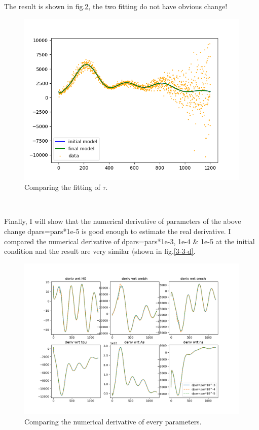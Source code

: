 \documentclass[showpacs, oneside, onecolumn, prl, amsmath, amssymb, nofootinbib, superscriptaddress, notitlepage]{revtex4-1}
\newcommand\bfig{\begin{figure}}
\newcommand\efig{\end{figure}}
\begin{document}
The result is shown in fig.\ref{3-3-2}, the two fitting do not have obvious change!
\bfig
	\centering
	\includegraphics[scale=1]{3-3-2.png}
	\caption{Comparing the fitting of $\tau$.}
	\label{3-3-2}
\efig

~~~~

Finally, I will show that the numerical derivative of parameters of the above change dpars=pars*1e-5 is good enough to estimate the real derivative. I compared the numerical derivative of dpars=pars*1e-3, 1e-4 \& 1e-5 at the initial condition and the result are very similar (shown in fig.\ref{3-3-d}.

\bfig
	\centering
	\includegraphics[scale=0.66]{3-3-3.png}
	\caption{Comparing the numerical derivative of every parameters.}
	\label{3-3-2}
\efig
\end{document}
